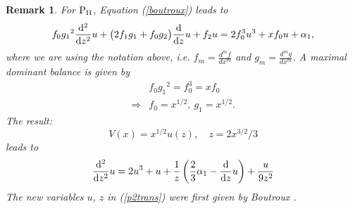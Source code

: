\documentclass{amsart}
\newtheorem{remark}[theorem]{Remark}
\theoremstyle{definition}
\theoremstyle{remark}
\theoremstyle{remark}
\begin{document}
\begin{remark}
For ${\rm P}_{\rm{\scriptstyle II}}$, Equation
(\ref{boutroux}) leads to
\[
f_0{g_1}^{2} {{\rm d}^{2}\over{\rm d} z^{2}}u
+\bigl(2 f_1g_1+f_0 g_2\bigr){{\rm d}\over{\rm d} z}u+f_2 u=
2 f_0^{3}u^{3}+x f_0 u+\alpha_{1},\]
where we are using the notation above, i.e.
$f_m=\frac{d^{m}f}{dx^{m}}$ and $g_m=\frac{d^{m}g}{dx^{m}}$.
A maximal dominant balance is given by
\begin{align*}
    &f_0{g_1}^{2}= f_0^{3}=xf_0\\
    \Rightarrow& f_0=x^{1/2},\ g_1=x^{1/2}.
    \end{align*}
The result:
\begin{equation}
    \label{p2trans}
    V(x)=x^{1/2}u(z),\quad z=2 x^{3/2}/3
    \end{equation}
leads to
\begin{equation}
    \label{p2boutroux}
    {{\rm d}^{2}\over{\rm d} z^{2}}u=2u^{3}+u+\frac 1z\left(\frac 23
    \alpha_{1}-{{\rm d}\over{\rm d} z}u\right)+\frac{u}{9z^{2}}
    \end{equation}
The new variables $u$, $z$ in (\ref{p2trans}) were first given by
Boutroux \cite{boutroux:I}.
\end{remark}
\end{document}
